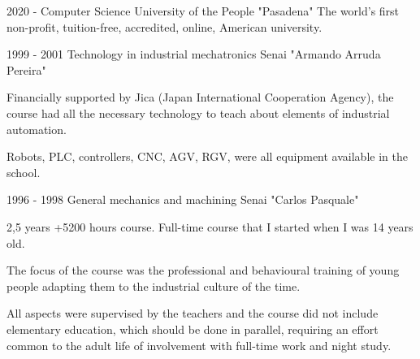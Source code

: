 \newpage
{}

\cvmetaevent
{2020 - }
{Computer Science}
{University of the People "Pasadena"}
{The world’s first non-profit, tuition-free, accredited, online, American university.}

\cvmetaevent
{1999 - 2001}
{Technology in industrial mechatronics}
{Senai "Armando Arruda Pereira"}
{Financially supported by Jica (Japan International Cooperation Agency), the course had all the necessary technology to teach about elements of industrial automation.

	Robots, PLC, controllers, CNC, AGV, RGV, were all equipment available in the school.}

\cvmetaevent
{1996 - 1998}
{General mechanics and machining}
{Senai "Carlos Pasquale"}
{2,5 years +5200 hours course. Full-time course that I started when I was 14 years old.

	The focus of the course was the professional and behavioural training of young people adapting them to the industrial culture of the time.

	All aspects were supervised by the teachers and the course did not include elementary education, which should be done in parallel, requiring an effort common to the adult life of involvement with full-time work and night study.}

\vfill\null
